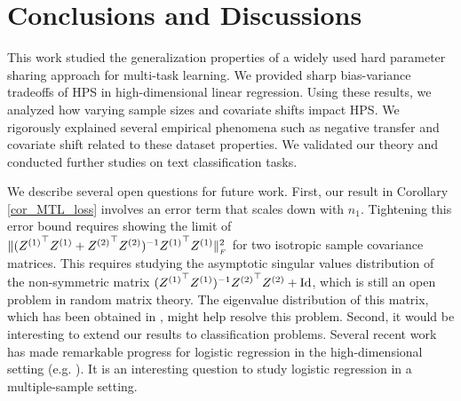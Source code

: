 \section{Conclusions and Discussions}\label{sec_conclude}

This work studied the generalization properties of a widely used hard parameter sharing approach for multi-task learning.
We provided sharp bias-variance tradeoffs of HPS in high-dimensional linear regression.
Using these results, we analyzed how varying sample sizes and covariate shifts impact HPS.
We rigorously explained several empirical phenomena such as negative transfer and covariate shift related to these dataset properties.
We validated our theory and conducted further studies on text classification tasks.

We describe several open questions for future work.
First, our result in Corollary \ref{cor_MTL_loss} involves an error term that scales down with $n_1$.
Tightening this error bound requires showing the limit of $\|({Z^{(1)}}^{\top} Z^{(1)} + {Z^{(2)}}^{\top} Z^{(2)})^{-1} {Z^{(1)}}^{\top} Z^{(1)}\|_{_{F}}^2$ for two isotropic sample covariance matrices.
This requires studying the asymptotic singular values distribution of the non-symmetric matrix $({Z^{(1)}}^{\top} Z^{(1)})^{-1}{Z^{(2)}}^{\top} Z^{(2)}+\operatorname{Id}$, which is still an open problem in random matrix theory.
The eigenvalue distribution of this matrix, which has been obtained in \citet{Fmatrix}, might help resolve this problem.
Second, it would be interesting to extend our results to classification problems.
Several recent work has made remarkable progress for logistic regression in the high-dimensional setting (e.g. \citet{sur2019modern}).
It is an interesting question to study logistic regression in a multiple-sample setting.


